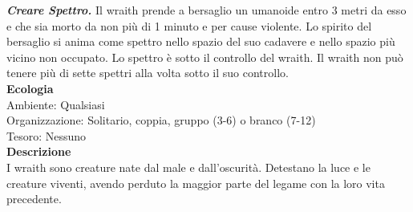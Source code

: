 \begin{multicols}{2}
\emph{\textbf{Creare Spettro.}} Il wraith prende a bersaglio un umanoide entro 3 metri da esso e che sia morto da non più di 1 minuto e per cause violente. Lo spirito del bersaglio si anima come spettro nello spazio del suo cadavere e nello spazio più vicino non occupato. Lo spettro è sotto il controllo del wraith. Il wraith non può tenere più di sette spettri alla volta sotto il suo controllo.\\
\textbf{Ecologia}\\
Ambiente: Qualsiasi\\
Organizzazione: Solitario, coppia, gruppo (3-6) o branco (7-12)\\
Tesoro: Nessuno\\
\textbf{Descrizione}\\
I wraith sono creature nate dal male e dall’oscurità. Detestano la luce e le creature viventi, avendo perduto la maggior parte del legame con la loro vita precedente.\\


\end{multicols}

